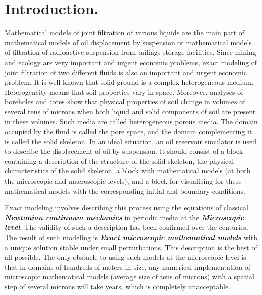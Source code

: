 \documentclass{article}
\theoremstyle{plain}
\theoremstyle{definition}
\numberwithin{equation}{section}
\begin{document}
\maketitle

\section{Introduction.}
\label{sec1}
Mathematical models of joint filtration of various liquids are the main part of mathematical models of oil displacement by suspension or mathematical models of filtration of radioactive suspension from tailings storage facilities. Since mining and ecology are very important and urgent economic problems, exact modeling of joint filtration of two different fluids is also an important and urgent economic problem. It is well known that solid ground is a complex heterogeneous medium. Heterogeneity means that soil properties vary in space. Moreover, analyses of boreholes and cores show that physical properties of soil change in volumes of several tens of microns when both liquid and solid components of soil are present in these volumes. Such media are called heterogeneous porous media. The domain occupied by the fluid is called the pore space, and the domain complementing it is called the solid skeleton. In an ideal situation, an oil reservoir simulator is used to describe the displacement of oil by suspension. It should consist of a block containing a description of the structure of the solid skeleton, the physical characteristics of the solid skeleton, a block with mathematical models (at both the microscopic and macroscopic levels), and a block for visualising for these mathematical models with the corresponding initial and boundary conditions. 

Exact modeling involves describing this process using the equations of classical \textbf{\emph{Newtonian continuum mechanics}} in periodic media at the \textbf{\emph{Microscopic level}}. The validity of such a description has been confirmed over the centuries. The result of such modeling is \textbf{\emph{Exact microscopic mathematical models}} with a unique solution stable under small perturbations. This description is the best of all possible. The only obstacle to using such models at the microscopic level is that in domains of hundreds of meters in size, any numerical implementation of microscopic mathematical models (average size of tens of microns) with a spatial step of several microns will take years, which is completely unacceptable.
\end{document}
